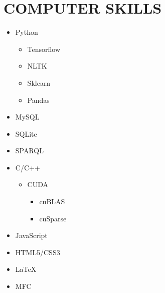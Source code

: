 \section{COMPUTER SKILLS}

\begin{cvcolumns}
	{
		\vspace{-2em}
		\begin{multicols}{2}
			\begin{itemize}
				\item Python
					\begin{itemize}
						\item Tensorflow
						\item NLTK
						\item Sklearn
						\item Pandas
				\end{itemize}
				\item MySQL
				\item SQLite
				\item SPARQL
				\item C/C++ 
					\begin{itemize}
						\item CUDA
						\begin{itemize}
							\item cuBLAS
							\item cuSparse
						\end{itemize}
					\end{itemize}
				\item JavaScript 
				\item HTML5/CSS3
				\item \LaTeX 
				\item MFC   
			\end{itemize}
		\end{multicols}
	}
	
	
\end{cvcolumns}

